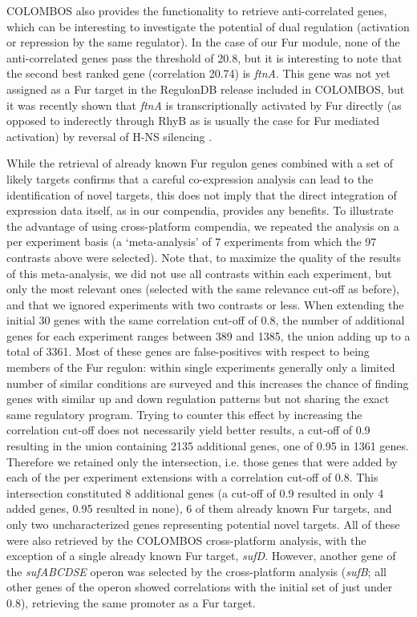 COLOMBOS also provides the functionality to retrieve anti-correlated genes, which can be interesting to investigate the potential of dual regulation (activation or repression by the same regulator). In the case of our Fur module, none of the anti-correlated genes pass the threshold of 20.8, but it is interesting to note that the second best ranked gene (correlation 20.74) is {\it ftnA}. This gene was not yet assigned as a Fur target in the RegulonDB release included in COLOMBOS, but it was recently shown that {\it ftnA} is transcriptionally activated by Fur directly (as opposed to inderectly through RhyB as is usually the case for Fur mediated activation) by reversal of H-NS silencing \cite{Nandal2010}.

While the retrieval of already known Fur regulon genes combined with a set of likely targets confirms that a careful co-expression analysis can lead to the identification of novel targets, this does not imply that the direct integration of expression data itself, as in our compendia, provides any benefits. To illustrate the advantage of using cross-platform compendia, we repeated the analysis on a per experiment basis (a `meta-analysis' of 7 experiments from which the 97 contrasts above were selected). Note that, to maximize the quality of the results of this meta-analysis, we did not use all contrasts within each experiment, but only the most relevant ones (selected with the same relevance cut-off as before), and that we ignored experiments with two contrasts or less. When extending the initial 30 genes with the same correlation cut-off of 0.8, the number of additional genes for each experiment ranges between 389 and 1385, the union adding up to a total of 3361. Most of these genes are false-positives with respect to being members of the Fur regulon: within single experiments generally only a limited number of similar conditions are surveyed and this increases the chance of finding genes with similar up and down regulation patterns but not sharing the exact same regulatory program. Trying to counter this effect by increasing the correlation cut-off does not necessarily yield better results, a cut-off of 0.9 resulting in the union containing 2135 additional genes, one of 0.95 in 1361 genes. Therefore we retained only the intersection, i.e. those genes that were added by each of the per experiment extensions with a correlation cut-off of 0.8. This intersection constituted 8 additional genes (a cut-off of 0.9 resulted in only 4 added genes, 0.95 resulted in none), 6 of them already known Fur targets, and only two uncharacterized genes representing potential novel targets. All of these were also retrieved by the COLOMBOS cross-platform analysis, with the exception of a single already known Fur target, {\it sufD}. However, another gene of the {\it sufABCDSE} operon was selected by the cross-platform analysis ({\it sufB}; all other genes of the operon showed correlations with the initial set of just under 0.8), retrieving the same promoter as a Fur target.



